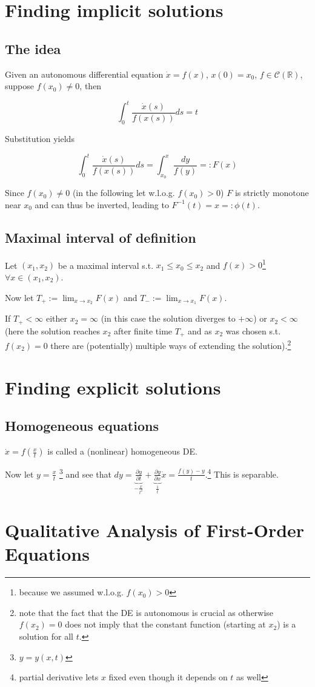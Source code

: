 \section{Finding implicit solutions}
\subsection{The idea}
Given an autonomous differential equation $\dot x = f(x)$, $x(0)=x_0$, $f\in\mathcal C(\mathbb R)$, suppose $f(x_0)\neq 0$, then

\begin{equation*}
	\int_0^t \frac{\dot x(s)}{f(x(s))}ds = t
\end{equation*}

Substitution yields

\begin{equation*}
	\int_0^t \frac{\dot x(s)}{f(x(s))}ds = \int_{x_0}^x \frac{dy}{f(y)} =: F(x)
\end{equation*}

Since $f(x_0)\neq 0$ (in the following let w.l.o.g. $f(x_0) > 0$) $F$ is strictly monotone near $x_0$ and can thus be inverted, leading to $F^{-1}(t) = x =: \phi(t)$.

\subsection{Maximal interval of definition}
Let $(x_1,x_2)$ be a maximal interval s.t. $x_1 \leq x_0 \leq x_2$ and $f(x)>0$\footnote{because we assumed w.l.o.g. $f(x_0) > 0$} $\forall x\in (x_1,x_2)$.

Now let $T_+ := \lim_{x\rightarrow x_2} F(x)$ and $T_- := \lim_{x\rightarrow x_1} F(x)$.

If $T_+ < \infty$ either $x_2 = \infty$ (in this case the solution diverges to $+\infty$) or $x_2 < \infty$ (here the solution reaches $x_2$ after finite time $T_+$ and as $x_2$ was chosen s.t. $f(x_2)=0$ there are (potentially) multiple ways of extending the solution).\footnote{note that the fact that the DE is autonomous is crucial as otherwise $f(x_2)=0$ does not imply that the constant function (starting at $x_2$) is a solution for all $t$.}

\section{Finding explicit solutions}
\subsection{Homogeneous equations}
$\dot x = f(\frac{x}{t})$ is called a (nonlinear) homogeneous DE.

Now let $y=\frac{x}{t}$ \footnote{$y=y(x,t)$} and see that $dy = \underbrace{\frac{\partial y}{\partial t}}_{-\frac{x}{t^2}} + \underbrace{\frac{\partial y}{\partial x}}_{\frac{1}{t}}\dot x = \frac{f(y)-y}{t}$.\footnote{partial derivative lets $x$ fixed even though it depends on $t$ as well} This is separable.

\section{Qualitative Analysis of First-Order Equations}
